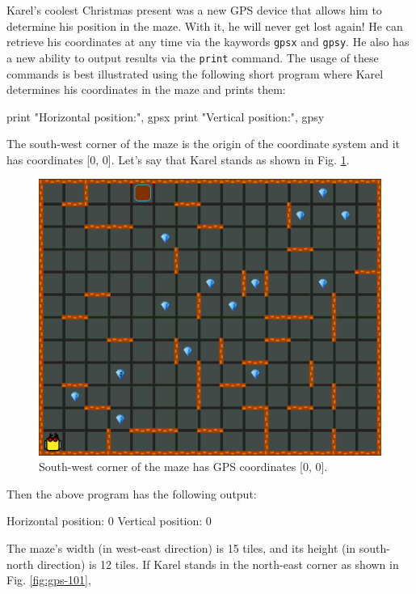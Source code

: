 Karel's coolest Christmas present was a new GPS device that allows him to determine his position 
in the maze. With it, he will never get lost again! He can retrieve his coordinates at any time via the 
kaywords {\tt gpsx} and {\tt gpsy}. He also has a new ability to output results via the {\tt print} 
command. The usage of these commands is best illustrated using the following short program where 
Karel determines his coordinates in the maze and prints them:

\begin{bluecode}
print "Horizontal position:", gpsx
print "Vertical position:", gpsy
\end{bluecode}
The south-west corner of the maze is the origin of the coordinate system and it has 
coordinates [0, 0]. Let's say that Karel stands as shown in Fig. \ref{fig:gps-100}.

\begin{figure}[!ht]
\begin{center}
\includegraphics[height=0.4\textwidth]{imgk/gps-100.png}
\vspace{-0mm}
\caption{South-west corner of the maze has GPS coordinates [0, 0].}
\label{fig:gps-100}
\end{center}
\end{figure}
\noindent
Then the above program has the following output:

\begin{greencode}
Horizontal position: 0
Vertical position: 0
\end{greencode}
The maze's width (in west-east direction) is 15 tiles, and its height (in south-north direction) 
is 12 tiles. If Karel stands in the north-east corner as shown in Fig. \ref{fig:gps-101},


